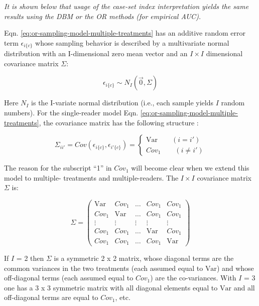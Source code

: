 \documentclass[
]{book}
\begin{document}
\emph{It is shown below that usage of the case-set index interpretation yields the same results using the DBM or the OR methods (for empirical AUC).}

Eqn. \eqref{eq:or-sampling-model-multiple-treatments} has an additive random error term \(\epsilon_{i\{c\}}\) whose sampling behavior is described by a multivariate normal distribution with an I-dimensional zero mean vector and an \(I \times I\) dimensional covariance matrix \(\Sigma\):

\begin{equation}
\epsilon_{i\{c\}} \sim N_I\left ( \vec{0} ,  \Sigma\right )
\label{eq:DefinitionEpsilon}
\end{equation}

Here \(N_I\) is the I-variate normal distribution (i.e., each sample yields \(I\) random numbers). For the single-reader model Eqn. \eqref{eq:or-sampling-model-multiple-treatments}, the covariance matrix has the following structure :

\begin{equation}
\Sigma_{ii'}=Cov\left ( \epsilon_{i\{c\}}, \epsilon_{i'\{c\}} \right )=\left\{\begin{matrix}
\text{Var} \qquad (i=i')\\ 
Cov_1 \qquad (i\neq i')
\end{matrix}\right.
\label{eq:DefinitionSigma}
\end{equation}

The reason for the subscript ``1'' in \(Cov_1\) will become clear when we extend this model to multiple- treatments and multiple-readers. The \(I \times I\) covariance matrix \(\Sigma\) is:

\begin{equation}
\Sigma=
\begin{pmatrix}
\text{Var} & Cov_1   & \ldots & Cov_1 & Cov_1 \\
Cov_1 & \text{Var}   & \ldots &Cov_1 & Cov_1 \\
\vdots & \vdots & \vdots & \vdots & \vdots \\
Cov_1 & Cov_1 & \ldots & \text{Var} & Cov_1 \\
Cov_1 & Cov_1 & \ldots & Cov_1 & \text{Var}
\end{pmatrix}
\label{eq:ExampleSigma}
\end{equation}

If \(I\) = 2 then \(\Sigma\) is a symmetric 2 x 2 matrix, whose diagonal terms are the common variances in the two treatments (each assumed equal to \(\text{Var}\)) and whose off-diagonal terms (each assumed equal to \(Cov_1\)) are the co-variances. With \(I\) = 3 one has a 3 x 3 symmetric matrix with all diagonal elements equal to \(\text{Var}\) and all off-diagonal terms are equal to \(Cov_1\), etc.
\end{document}
